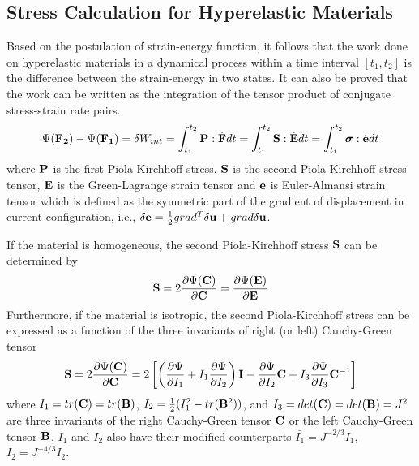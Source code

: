\subsection{Stress Calculation for Hyperelastic Materials}
Based on the postulation of strain-energy function, it follows that the work done on hyperelastic materials in a dynamical process within a time interval $[t_1, t_2]$ is the difference between the strain-energy in two states. It can also be proved that the work can be written as the integration of the tensor product of conjugate stress-strain rate pairs.
\begin{equation}
\Psi({\bold{F_2}}) - \Psi({\bold{F_1}}) = \delta{W_{int}} = \int_{t_1}^{t_2}\bold{P}:\dot{\bold{F}}dt = \int_{t_1}^{t_2}\bold{S}:\dot{\bold{E}}dt = 
\int_{t_1}^{t_2}\boldsymbol{\sigma}:\dot{\bold{e}}dt
\end{equation}
where $\bold{P}$ is the first Piola-Kirchhoff stress, $\bold{S}$ is the second Piola-Kirchhoff stress tensor, $\bold{E}$ is the Green-Lagrange strain tensor and $\bold{e}$ is Euler-Almansi strain tensor which is defined as the symmetric part of the gradient of displacement in current configuration, i.e., $\delta\bold{e} = \frac{1}{2}{ grad^T\delta\bold{u} + grad\delta\bold{u}}$.

If the material is homogeneous, the second Piola-Kirchhoff stress $\bold{S}$ can be determined by 
\begin{equation}
\bold{S} = 2\frac{\partial\Psi(\bold{C})}{\partial{\bold{C}}} = \frac{\partial\Psi(\bold{E})}{\partial{\bold{E}}}
\end{equation}
Furthermore, if the material is isotropic, the second Piola-Kirchhoff stress can be expressed as a function of the three invariants of right (or left) Cauchy-Green tensor
\begin{equation} \label{PK2}
\bold{S} = 2\frac{\partial\Psi({\bold{C})}}{\partial{\bold{C}}} = 2\left[\left( \frac{\partial\Psi}{\partial{I_1}} + I_1 \frac{\partial\Psi}{\partial{I_2}} \right)\bold{I} -  \frac{\partial\Psi}{\partial{I_2}}\bold{C} + I_3 \frac{\partial\Psi}{\partial{I_3}}{\bold{C}}^{-1} \right]
\end{equation}
where $I_1 = tr(\bold{C}) = tr(\bold{B})$, $I_2 = \frac{1}{2}(I_1^2 - tr(\bold{B}^2))$, and $I_3 = det(\bold{C}) = det(\bold{B}) = J^2$ are three invariants of the right Cauchy-Green tensor $\bold{C}$ or the left Cauchy-Green tensor $\bold{B}$. $I_1$ and $I_2$ also have their modified counterparts $\bar{I_1} = J^{-2/3}I_1$, $\bar{I_2} = J^{-4/3}I_2$.

